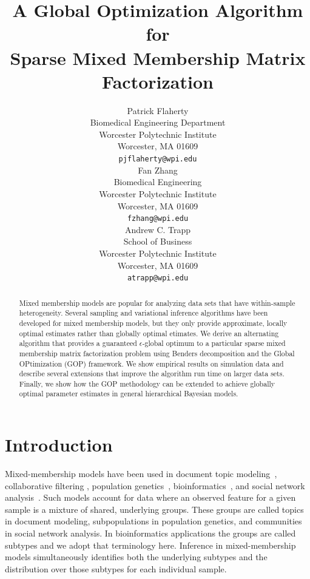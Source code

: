 \documentclass{article} %
\title{A Global Optimization Algorithm for \\ 
Sparse Mixed Membership Matrix Factorization}
\author{
Patrick Flaherty\\
Biomedical Engineering Department\\
Worcester Polytechnic Institute\\
Worcester, MA 01609 \\
\texttt{pjflaherty@wpi.edu} \\
\And
Fan Zhang \\
Biomedical Engineering \\
Worcester Polytechnic Institute\\
Worcester, MA 01609 \\
\texttt{fzhang@wpi.edu} \\
\And
Andrew C. Trapp \\
School of Business \\
Worcester Polytechnic Institute \\
Worcester, MA 01609 \\
\texttt{atrapp@wpi.edu}
}
\begin{document}
\maketitle

\begin{abstract}
Mixed membership models are popular for analyzing data sets that have
within-sample heterogeneity. Several sampling and variational inference
algorithms have been developed for mixed membership models, but they only
provide approximate, locally optimal estimates rather than globally optimal
etimates. We derive an alternating algorithm that provides a guaranteed
$\epsilon$-global optimum to a particular sparse mixed membership matrix
factorization problem using Benders decomposition and the Global OPtimization
(GOP) framework. We show empirical results on simulation data and describe
several extensions that improve the algorithm run time on larger data sets.
Finally, we show how the GOP methodology can be extended to achieve globally
optimal parameter estimates in general hierarchical Bayesian models.

\end{abstract}

\section{Introduction}\label{sec:intro}

Mixed-membership models have been used in document topic
modeling~\cite{Blei2003a}, collaborative filtering \cite{Mackey2010},
population genetics~\cite{Pritchard2000}, bioinformatics~\cite{Rogers2005}, and
social network analysis~\cite{Airoldi:2008wi}. Such models account for data
where an observed feature for a given sample is a mixture of shared, underlying
groups. These groups are called topics in document modeling, subpopulations in
population genetics, and communities in social network analysis. In
bioinformatics applications the groups are called subtypes and we adopt that
terminology here. Inference in mixed-membership models simultaneously
identifies both the underlying subtypes and the distribution over those
subtypes for each individual sample.
\end{document}
